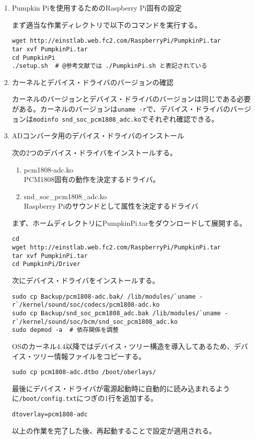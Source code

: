 \begin{enumerate}
\def\labelenumi{\arabic{enumi}.}
\item
  Pumpkin Piを使用するためのRaspberry Pi固有の設定

  まず適当な作業ディレクトリで以下のコマンドを実行する。

\begin{verbatim}
wget http://einstlab.web.fc2.com/RaspberryPi/PumpkinPi.tar
tar xvf PumpkinPi.tar
cd PumpkinPi
./setup.sh  # @参考文献では ./PumpkinPi.sh と表記されている
\end{verbatim}
\item
  カーネルとデバイス・ドライバのバージョンの確認

  カーネルのバージョンとデバイス・ドライバのバージョンは同じである必要がある。カーネルのバージョンは\texttt{uname\ -r}で、デバイス・ドライバのバージョンは\texttt{modinfo\ snd\_soc\_pcm1808\_adc.ko}でそれぞれ確認できる。
\item
  ADコンバータ用のデバイス・ドライバのインストール

  次の2つのデバイス・ドライバをインストールする。

  \begin{enumerate}
  \def\labelenumii{\arabic{enumii}.}
  \tightlist
  \item
    pcm1808-adc.ko\\
    PCM1808固有の動作を決定するドライバ。
  \item
    snd\_soc\_pcm1808\_adc.ko\\
    Raspberry Piのサウンドとして属性を決定するドライバ
  \end{enumerate}

  まず、ホームディレクトリにPumpkinPi.tarをダウンロードして展開する。

\begin{verbatim}
cd 
wget http://einstlab.web.fc2.com/RaspberryPi/PumpkinPi.tar
tar xvf PumpkinPi.tar
cd PumpkinPi/Driver
\end{verbatim}

  次にデバイス・ドライバをインストールする。

\begin{verbatim}
sudo cp Backup/pcm1808-adc.bak/ /lib/modules/`uname -r`/kernel/sound/soc/codecs/pcm1808-adc.ko
sudo cp Backup/snd_soc_pcm1808_adc.bak /lib/modules/`uname -r`/kernel/sound/soc/bcm/snd_soc_pcm1808_adc.ko
sudo depmod -a  # 依存関係を調整
\end{verbatim}

  OSのカーネル4.4以降ではデバイス・ツリー構造を導入してあるため、デバイス・ツリー情報ファイルをコピーする。

\begin{verbatim}
sudo cp pcm1808-adc.dtbo /boot/oberlays/
\end{verbatim}

  最後にデバイス・ドライバが電源起動時に自動的に読み込まれるように\texttt{/boot/config.txt}につぎの1行を追加する。

\begin{verbatim}
dtoverlay=pcm1808-adc
\end{verbatim}

  以上の作業を完了した後、再起動することで設定が適用される。
\end{enumerate}
